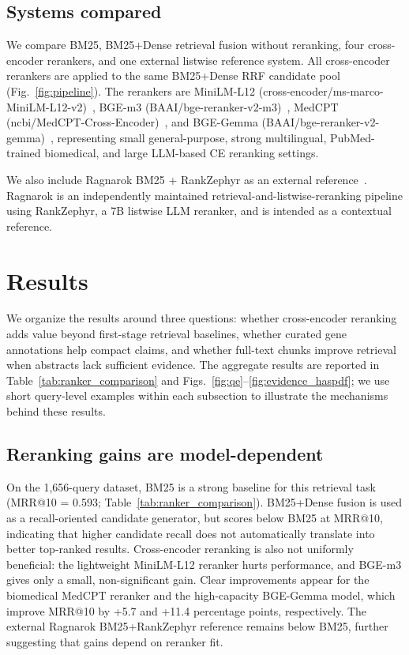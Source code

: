 \documentclass[runningheads]{llncs}
\begin{document}
\subsection{Systems compared}
\label{sec:systems_compared}
We compare BM25, BM25+Dense retrieval fusion without reranking, four cross-encoder rerankers, and one external listwise reference system. All cross-encoder rerankers are applied to the same BM25+Dense RRF candidate pool (Fig.~\ref{fig:pipeline}). The rerankers are MiniLM-L12 (cross-encoder/ms-marco-MiniLM-L12-v2)~\cite{wang_minilm_2020}, BGE-m3 (BAAI/bge-reranker-v2-m3)~\cite{chen_m3-embedding_2024}, MedCPT (ncbi/MedCPT-Cross-Encoder)~\cite{jin_medcpt_2023}, and BGE-Gemma (BAAI/bge-reranker-v2-gemma)~\cite{noauthor_baaibge-reranker-v2-gemma_2026}, representing small general-purpose, strong multilingual, PubMed-trained biomedical, and large LLM-based CE reranking settings.

We also include Ragnarok BM25 + RankZephyr as an external reference~\cite{pradeep_ragnarok_2025,pradeep_rankzephyr_2023}. Ragnarok is an independently maintained retrieval-and-listwise-reranking pipeline using RankZephyr, a 7B listwise LLM reranker, and is intended as a contextual reference.


\section{Results}
\label{sec:results}

We organize the results around three questions: whether cross-encoder reranking
adds value beyond first-stage retrieval baselines, whether curated gene
annotations help compact claims, and whether full-text chunks improve
retrieval when abstracts lack sufficient evidence. The aggregate results are reported in Table~\ref{tab:ranker_comparison} and Figs.~\ref{fig:qe}--\ref{fig:evidence_haspdf};
we use short query-level examples within each subsection to illustrate the mechanisms behind these results.

\subsection{Reranking gains are model-dependent}
\label{sec:results_reranking}
On the 1,656-query dataset, BM25 is a strong baseline for this retrieval task
(MRR@10 = 0.593; Table~\ref{tab:ranker_comparison}). BM25+Dense fusion
is used as a recall-oriented candidate generator, but
scores below BM25 at MRR@10, indicating that higher candidate recall does not automatically translate into better top-ranked results. Cross-encoder reranking is also not uniformly beneficial:
the lightweight MiniLM-L12 reranker hurts performance, and BGE-m3 gives
only a small, non-significant gain. Clear improvements appear for the biomedical
MedCPT reranker and the high-capacity BGE-Gemma model, which improve MRR@10 by
+5.7 and +11.4 percentage points, respectively. The external Ragnarok
BM25+RankZephyr reference remains below BM25, further suggesting that gains
depend on reranker fit.
\end{document}
